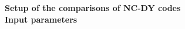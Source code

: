 
\newcommand{\be}{\begin{equation}}
\newcommand{\ee}{\end{equation}}
\newcommand{\bea}{\begin{eqnarray}}
\newcommand{\eea}{\end{eqnarray}}
\newcommand{\smallw}{{\scriptscriptstyle W}}
\newcommand{\smallz}{{\scriptscriptstyle Z}}
\newcommand{\mt}{m_t} 
\newcommand{\mh}{m_H} 
\newcommand{\mw}{m_\smallw} 
\newcommand{\mz}{m_\smallz} 
\newcommand{\mzsq}{m_\smallz^2} 
\newcommand{\oa}{${\cal O}(\alpha)~$} 
\newcommand{\sineffl}{\sin\theta_{eff}^{\ell}\,}
\newcommand{\coseffl}{\cos\theta_{eff}^{\ell}\,}
\newcommand{\seffl}{\sin^2\theta_{eff}^{\ell}\,}
\newcommand{\ceffl}{\cos^2\theta_{eff}^{\ell}\,}

\setlength{\textwidth}{17.5cm}
\setlength{\textheight}{23cm}
\setlength{\topmargin}{-1cm}
\setlength{\oddsidemargin}{-0.5cm}
\setlength{\evensidemargin}{-0.5cm}





{\Large \bf Setup of the comparisons of NC-DY codes}\\

 {\bf Input parameters}\\


